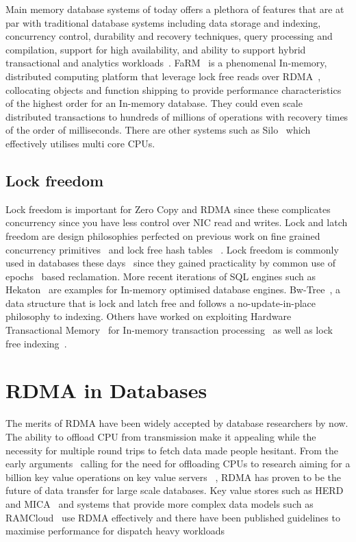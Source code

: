 Main memory database systems of today offers a plethora of features that are at par with traditional
database systems including data storage and indexing, concurrency control, durability and 
recovery techniques, query processing and compilation, support for high availability, and 
ability to support hybrid transactional and analytics workloads~\cite{mmdbmstutorial}.
FaRM~\cite{farm} is a phenomenal In-memory, distributed computing platform that leverage lock free reads over RDMA~\cite{rdma},
collocating objects and function shipping to provide performance characteristics of the 
highest order for an In-memory database. They could even scale distributed transactions to
hundreds of millions of operations with recovery times of the order of milliseconds. There 
are other systems such as Silo~\cite{silo} which effectively utilises multi core CPUs.

\subsection{Lock freedom}
Lock freedom is important for Zero Copy and RDMA since these complicates concurrency since
you have less control over NIC read and writes. Lock and latch freedom are 
design philosophies perfected on previous work on fine grained concurrency 
primitives~\cite{finegrained} and lock free hash tables ~\cite{lockfreeht}. Lock freedom is commonly
used in databases these days~\cite{htm} since they gained practicality by common use of
epochs~\cite{lockfreedom} based reclamation. 
More recent iterations of SQL engines such as Hekaton~\cite{hekaton} are 
examples for In-memory optimised  database engines. Bw-Tree~\cite{bw-tree}, a 
data structure that is lock and latch free and follows a no-update-in-place philosophy to indexing.
Others have worked on exploiting Hardware Transactional Memory~\cite{htm-old}
for In-memory transaction processing~\cite{drtm} as well as lock free indexing~\cite{htm}.

\section{RDMA in Databases}
The merits of RDMA have been widely accepted by database researchers by now. The 
ability to offload CPU from transmission make it appealing while the necessity for 
multiple round trips to fetch data made people hesitant. From
the early arguments~\cite{rdmacase} calling for the need for offloading CPUs to 
research aiming for a billion key value operations on key value servers ~\cite{rdmabillion},
RDMA has proven to be the future of data transfer for large scale databases. Key value stores
such as HERD~\cite{herd} and MICA~\cite{mica} and systems that provide more complex
data models such as RAMCloud~\cite{ramcloud} use RDMA effectively and there have been 
published guidelines to maximise performance for dispatch heavy workloads~\cite{rdma}

